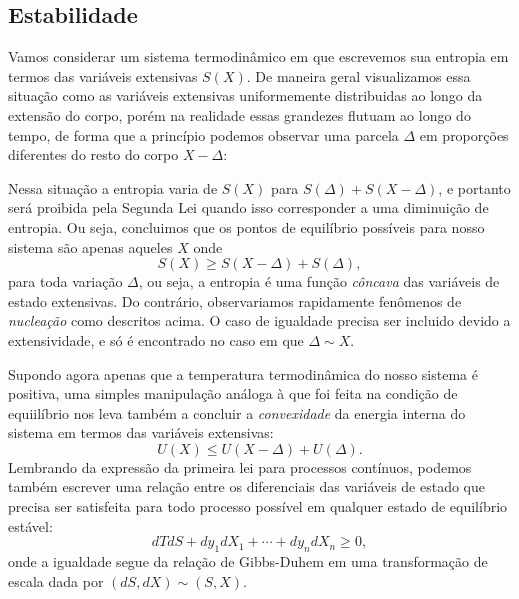 \documentclass[a4paper, 12pt]{article}
\theoremstyle{definition}
\theoremstyle{definition}
\begin{document}
\subsection{Estabilidade}

Vamos considerar um sistema termodinâmico em que escrevemos sua entropia em termos das variáveis extensivas $S(X)$.
De maneira geral visualizamos essa situação como as variáveis extensivas uniformemente distribuidas ao longo da
extensão do corpo, porém na realidade essas grandezes flutuam ao longo do tempo, de forma que a princípio podemos 
observar uma parcela $\Delta$ em proporções diferentes do resto do corpo $X-\Delta$:

\begin{figure}[H]
    \centering
\end{figure}
Nessa situação a entropia varia de $S(X)$ para $S(\Delta)+S(X-\Delta)$, e portanto será proibida pela Segunda Lei quando
isso corresponder a uma diminuição de entropia. Ou seja, concluimos que os pontos de equilíbrio possíveis para nosso
sistema são apenas aqueles $X$ onde
$$S(X)\geq S(X-\Delta)+S(\Delta),$$
para toda variação $\Delta$, ou seja, a entropia é uma função \textit{côncava} das variáveis de estado extensivas. 
Do contrário, observariamos rapidamente fenômenos de \textit{nucleação} como descritos acima. O caso de igualdade 
precisa ser incluido devido a extensividade, e só é encontrado no caso em que $\Delta\sim X$.

Supondo agora apenas que a temperatura termodinâmica do nosso sistema é positiva, uma simples manipulação
análoga à que foi feita na condição de equiilíbrio nos leva também a concluir a \textit{convexidade} 
da energia interna do sistema em termos das variáveis extensivas:
$$U(X)\leq U(X-\Delta)+U(\Delta).$$
Lembrando da expressão da primeira lei para processos contínuos, podemos também escrever uma relação
entre os diferenciais das variáveis de estado que precisa ser satisfeita para todo processo possível em qualquer
estado de equilíbrio estável:
$$dTdS+dy_1dX_1+\cdots+dy_ndX_n\geq0,$$
onde a igualdade segue da relação de Gibbs-Duhem em uma transformação de escala dada por $(dS,dX)\sim(S,X)$.
\end{document}
